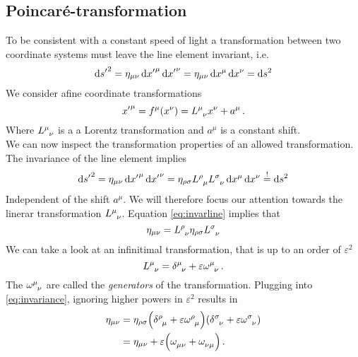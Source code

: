 \subsection{Poincaré-transformation}
To be consistent with a constant speed of light a transformation between two
coordinate systems must leave the line element invariant, i.e.
\begin{equation}
    \dif {s^\prime}^2 = \eta_{\mu\nu}\dif {x^\prime}^\mu\dif
    {x^\prime}^\nu=\eta_{\mu\nu}\dif x^\mu\dif
    x^\nu = \dif s^2 \label{eq:invarline}
\end{equation}
We consider afine coordinate transformations
\begin{equation}
    {x^\prime}^\mu= f^\mu(x^\nu)=\tensor{L}{^\mu_\nu}x^\nu+a^\mu\, .
\end{equation}
Where $\tensor{L}{^\mu_\nu}$ is a a Lorentz transformation and $a^\mu$ is a
constant shift.\\
We can now inspect the transformation properties of an allowed transformation.
The invariance of the line element implies
\begin{equation}
    \dif {s^\prime}^2 = \eta_{\mu\nu}\dif {x^\prime}^\mu\dif
    {x^\prime}^\nu=\eta_{\rho\sigma}\tensor{L}{^\rho_\mu}\tensor{L}{^\sigma_\nu}\dif
    x^\mu\dif x^\nu \stackrel{!}{=} \dif s^2
\end{equation}
Independent of the shift $a^\mu$. We will therefore focus our attention towards
the linerar transformation $\tensor{L}{^\mu_\nu}$. Equation
\eqref{eq:invarline} implies that
\begin{equation}
    \eta_{\mu\nu}=\tensor{L}{^\rho_\nu}\eta_{\rho\sigma}\tensor{L}{^\sigma_\nu}\label{eq:invariance}
\end{equation}
We can take a look at an infinitimal transformation, that is up to an order of
$\varepsilon^2$
\begin{equation}
    \tensor{L}{^\mu_\nu}=\tensor{\delta}{^\mu_\nu}
    +\varepsilon\tensor{\omega}{^\mu_\nu}\, .
\end{equation}
The $\tensor{\omega}{^\mu_\nu}$ are called the \emph{generators} of the
transformation. Plugging into \eqref{eq:invariance}, ignoring higher powers in
$\varepsilon^2$ results in
\begin{equation}
    \begin{split}
        \eta_{\mu\nu}&=\eta_{\rho\sigma}\left(\tensor{\delta}{^\rho_\mu}
        +\varepsilon\tensor{\omega}{^\rho_\mu}\right)\left(\tensor{\delta}{^\sigma_\nu}
        +\varepsilon\tensor{\omega}{^\sigma_\nu}\right)\\
        &=
        \eta_{\mu\nu}+\varepsilon\left(\tensor{\omega}{_\mu_\nu}+\tensor{\omega}{_\nu_\mu}\right)\,
        .
    \end{split}
\end{equation}
